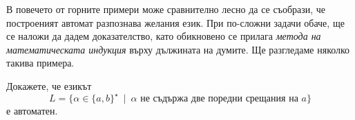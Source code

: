 В повечето от горните примери може сравнително лесно да се съобрази, че построеният автомат разпознава желания език.
При по-сложни задачи обаче, ще се наложи да дадем доказателство, като обикновено се прилага 
{\em метода на математическата индукция} върху дължината на думите.
Ще разгледаме няколко такива примера.

\begin{problem}
  Докажете, че езикът
  \[L = \{\alpha \in \{a,b\}^\star\ \mid\ \alpha\mbox{ не съдържа две поредни срещания на }a\}\]
  е автоматен.
\end{problem}
